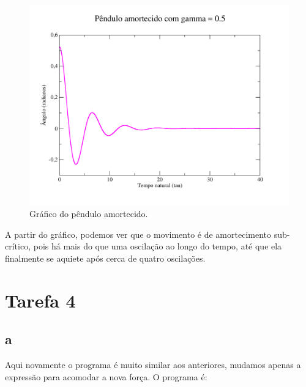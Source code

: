 \documentclass[12pt,a4paper]{article}
\begin{document}
\begin{figure}[H]
\centering
\includegraphics[width=\textwidth]{../tarefa-3/grafico.png}
\caption{Gráfico do pêndulo amortecido.}
\end{figure}

A partir do gráfico, podemos ver que o movimento é de amortecimento sub-crítico, pois há mais do que uma oscilação ao longo do tempo, até que ela finalmente se aquiete após cerca de quatro oscilações.

\section{Tarefa 4}
\subsection{a}
Aqui novamente o programa é muito similar aos anteriores, mudamos apenas a expressão para acomodar a nova força. O programa é:
\end{document}
